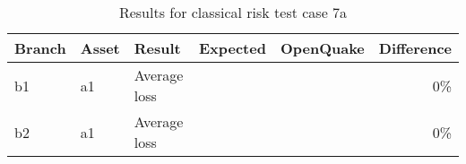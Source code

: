 \begin{table}[htbp]

\centering
\begin{tabular}{ l l l r r r }

\hline
\rowcolor{anti-flashwhite}
\bf{Branch} & \bf{Asset} & \bf{Result} & \bf{Expected} & \bf{OpenQuake} & \bf{Difference}\\
\hline
b1 & a1 & Average loss &  &  & 0\% \\
b2 & a1 & Average loss &  &  & 0\% \\
\hline
\end{tabular}

\caption{Results for classical risk test case 7a}
\label{tab:result-classical-risk-7a}
\end{table}